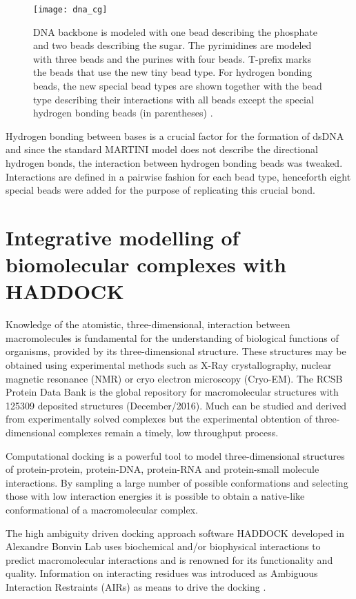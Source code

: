 \documentclass[
	12pt,				%
	openright,			%
	twoside,			%
	a4paper,			%
	english,			%
	french,				%
	spanish,			%
	brazil,				%
	]{abntex2}
\begin{document}
\begin{figure}
	\centering
	\texttt{[image: dna\_cg]}
	\caption{DNA backbone is modeled with one bead describing the phosphate and two beads describing the sugar. The pyrimidines are modeled with three beads and the purines with four beads. T-prefix marks the beads that use the new tiny bead type. For hydrogen bonding beads, the new special bead types are shown together with the bead type describing their interactions with all beads except the special hydrogen bonding beads (in parentheses) \cite{Uusitalo2015}.}
	\label{fig:dnacg}
\end{figure}

Hydrogen bonding between bases is a crucial factor for the formation of dsDNA and since the standard MARTINI model does not describe the directional hydrogen bonds, the interaction between hydrogen bonding beads was tweaked. Interactions are defined in a pairwise fashion for each bead type, henceforth eight special beads were added for the purpose of replicating this crucial bond. 

\section{Integrative modelling of biomolecular complexes with HADDOCK}

Knowledge of the atomistic, three-dimensional, interaction between macromolecules is fundamental for the understanding of biological functions of organisms, provided by its three-dimensional structure. These structures may be obtained using experimental methods such as X-Ray crystallography, nuclear magnetic resonance (NMR) or cryo electron microscopy (Cryo-EM). The RCSB Protein Data Bank \cite{Berman2000} is the global repository for macromolecular structures with 125309 deposited structures (December/2016). Much can be studied and derived from experimentally solved complexes but the experimental obtention of three-dimensional complexes remain a timely, low throughput process.

Computational docking is a powerful tool to model three-dimensional structures of protein-protein, protein-DNA, protein-RNA and protein-small molecule interactions. By sampling a large number of possible conformations and selecting those with low interaction energies it is possible to obtain a native-like conformational of a macromolecular complex.

The high ambiguity driven docking approach software HADDOCK developed in Alexandre Bonvin Lab uses biochemical and/or biophysical interactions to predict macromolecular interactions and is renowned for its functionality and quality. Information on interacting residues was introduced as Ambiguous Interaction Restraints (AIRs) as means to drive the docking \cite{Dominguez2003}.
\end{document}
